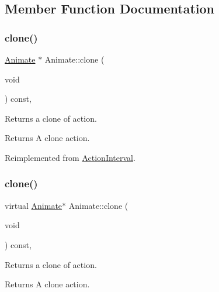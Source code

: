 \subsection{Member Function Documentation}
\mbox{\label{classAnimate_a1c234e715c559e4482d7f955cf3f3e2d}} 
\subsubsection{\texorpdfstring{clone()}{clone()}\hspace{0.1cm}{\footnotesize\ttfamily [1/2]}}
{\footnotesize\ttfamily \hyperlink{classAnimate}{Animate} $\ast$ Animate\+::clone (\begin{DoxyParamCaption}\item[{void}]{ }\end{DoxyParamCaption}) const\hspace{0.3cm}{\ttfamily [override]}, {\ttfamily [virtual]}}

Returns a clone of action.

\begin{DoxyReturn}{Returns}
A clone action. 
\end{DoxyReturn}


Reimplemented from \hyperlink{classActionInterval_abc93ce0c2f54a90eb216a7803f25f44a}{Action\+Interval}.

\mbox{\label{classAnimate_a71fedb833a7443dfd48237a6c3b339ab}} 
\subsubsection{\texorpdfstring{clone()}{clone()}\hspace{0.1cm}{\footnotesize\ttfamily [2/2]}}
{\footnotesize\ttfamily virtual \hyperlink{classAnimate}{Animate}$\ast$ Animate\+::clone (\begin{DoxyParamCaption}\item[{void}]{ }\end{DoxyParamCaption}) const\hspace{0.3cm}{\ttfamily [override]}, {\ttfamily [virtual]}}

Returns a clone of action.

\begin{DoxyReturn}{Returns}
A clone action. 
\end{DoxyReturn}


